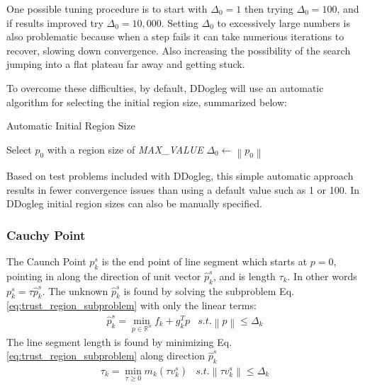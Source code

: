 \documentclass[peerreview,compsoc,onecolumn]{IEEEtran}
\newcommand{\R}{\mathbb{R}}
\newcommand{\norm}[1]{\left\lVert#1\right\rVert}
\begin{document}
One possible tuning procedure is to start with $\Delta_0=1$ then trying $\Delta_0=100$, and if results improved try $\Delta_0=10,000$. Setting $\Delta_0$ to excessively large numbers is also problematic because when a step fails it can take numerious iterations to recover, slowing down convergence. Also increasing the possibility of the search jumping into a flat plateau far away and getting stuck. 

To overcome these difficulties, by default, DDogleg will use an automatic algorithm for selecting the initial region size, summarized below:
\begin{algorithm}{}
\caption{\label{alg:initial_region}Automatic Initial Region Size}
\begin{algorithmic}[1]
	\State Select $p_0$ with a region size of \textit{MAX\_VALUE}
	\State $\Delta_0 \gets \norm{p_0}$ 
\end{algorithmic}
\end{algorithm}
Based on test problems included with DDogleg, this simple automatic approach results in fewer convergence issues than using a default value such as 1 or 100. In DDogleg initial region sizes can also be manually specified.

\subsubsection{Cauchy Point}
\label{section:cauchy} 

The Caunch Point $p^s_k$ is the end point of line segment which starts at $p=0$, pointing in along the direction of unit vector $\hat{p}^s_k$, and is length $\tau_k$. In other words $p^s_k = \tau \hat{p}^s_k$. The unknown $\hat{p}^s_k$ is found by solving the subproblem Eq. \ref{eq:trust_region_subproblem} with only the linear terms:
\begin{equation}
\begin{array}{lr}
\hat{p}^s_k = \min\limits_{p\in \R^n} f_k + g_k^T p & s.t. \norm{p} \le \Delta_k
\end{array}
\end{equation}
The line segment length is found by minimizing Eq. \ref{eq:trust_region_subproblem} along direction $\hat{p}^s_k$
\begin{equation}
\begin{array}{lr}
\tau_k = \min\limits_{\tau \ge 0} m_k(\tau v^s_k) & s.t. \norm{\tau v^s_k} \le \Delta_k
\end{array}
\end{equation}
\end{document}
